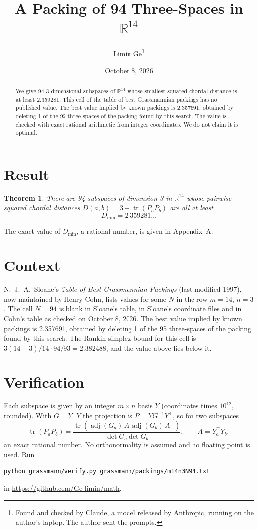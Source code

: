 \documentclass[11pt,a4paper]{article}
\title{A Packing of 94 Three-Spaces in $\mathbb{R}^{14}$}
\author{Limin Ge\thanks{Found and checked by Claude, a model released by Anthropic, running on the author's laptop. The author sent the prompts.}}
\date{October 8, 2026}
\newtheorem*{theorem}{Theorem}
\begin{document}
\maketitle
\begin{abstract}
We give 94 3-dimensional subspaces of $\mathbb{R}^{14}$ whose smallest squared chordal distance is at least 2.359281. This cell of the table of best Grassmannian packings has no published value. The best value implied by known packings is 2.357691, obtained by deleting 1 of the 95 three-spaces of the packing found by this search. The value is checked with exact rational arithmetic from integer coordinates. We do not claim it is optimal.
\end{abstract}

\section{Result}
\begin{theorem}
There are 94 subspaces of dimension 3 in $\mathbb{R}^{14}$ whose pairwise squared chordal distances $D(a,b) = 3 - \operatorname{tr}(P_aP_b)$ are all at least
\[ D_{\min} = 2.359281\ldots \]
\end{theorem}
The exact value of $D_{\min}$, a rational number, is given in Appendix~A.


\section{Context}
N.~J.~A.~Sloane's \emph{Table of Best Grassmannian Packings} (last modified 1997), now maintained by Henry Cohn, lists values for some $N$ in the row $m=14$, $n=3$. The cell $N=94$ is blank in Sloane's table, in Sloane's coordinate files and in Cohn's table as checked on October 8, 2026. The best value implied by known packings is 2.357691, obtained by deleting 1 of the 95 three-spaces of the packing found by this search. The Rankin simplex bound for this cell is $3(14-3)/14\cdot 94/93 = 2.382488$, and the value above lies below it.


\section{Verification}
Each subspace is given by an integer $m\times n$ basis $Y$ (coordinates times $10^{12}$, rounded). With $G=Y^\top Y$ the projection is $P=YG^{-1}Y^\top$, so for two subspaces
\[ \operatorname{tr}(P_aP_b)=\frac{\operatorname{tr}(\operatorname{adj}(G_a)\,A\,\operatorname{adj}(G_b)\,A^\top)}{\det G_a\det G_b},\qquad A=Y_a^\top Y_b, \]
an exact rational number. No orthonormality is assumed and no floating point is used. Run
\begin{verbatim}
python grassmann/verify.py grassmann/packings/m14n3N94.txt
\end{verbatim}
in \url{https://github.com/Ge-limin/math}.
\end{document}
